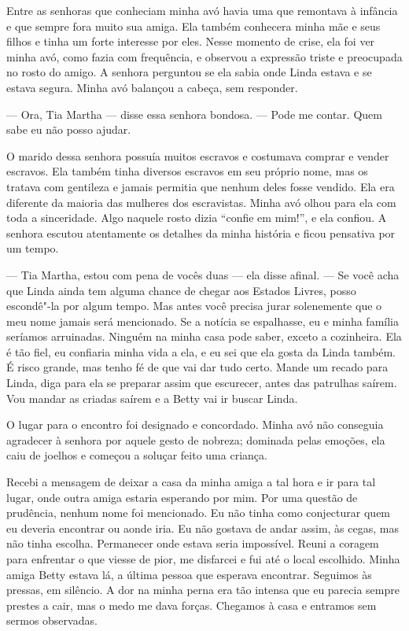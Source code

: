 Entre as senhoras que conheciam minha
avó havia uma que remontava à infância e que sempre fora muito sua
amiga. Ela também conhecera minha mãe e seus filhos e tinha um forte
interesse por eles. Nesse momento de crise, ela foi ver minha avó, como
fazia com frequência, e observou a expressão triste e preocupada no
rosto do amigo. A senhora perguntou se ela sabia onde Linda estava e se
estava segura. Minha avó balançou a cabeça, sem responder.

--- Ora, Tia Martha --- disse essa senhora bondosa. --- Pode me contar.
Quem sabe eu não posso ajudar.

O marido dessa senhora possuía muitos escravos e costumava comprar e
vender escravos. Ela também tinha diversos escravos em seu próprio nome,
mas os tratava com gentileza e jamais permitia que nenhum deles fosse
vendido. Ela era diferente da maioria das mulheres dos escravistas.
Minha avó olhou para ela com toda a sinceridade. Algo naquele rosto
dizia ``confie em mim!'', e ela confiou. A senhora escutou atentamente
os detalhes da minha história e ficou pensativa por um tempo.

--- Tia Martha, estou com pena de vocês duas --- ela disse afinal. ---
Se você acha que Linda ainda tem alguma chance de chegar aos Estados
Livres, posso escondê"-la por algum tempo. Mas antes você precisa jurar
solenemente que o meu nome jamais será mencionado. Se a notícia se
espalhasse, eu e minha família seríamos arruinadas. Ninguém na minha
casa pode saber, exceto a cozinheira. Ela é tão fiel, eu confiaria minha
vida a ela, e eu sei que ela gosta da Linda também. É risco grande, mas
tenho fé de que vai dar tudo certo. Mande um recado para Linda, diga
para ela se preparar assim que escurecer, antes das patrulhas saírem.
Vou mandar as criadas saírem e a Betty vai ir buscar Linda.

O lugar para o encontro foi designado e concordado. Minha avó não
conseguia agradecer à senhora por aquele gesto de nobreza; dominada
pelas emoções, ela caiu de joelhos e começou a soluçar feito uma
criança.

Recebi a mensagem de deixar a casa da
minha amiga a tal hora e ir para tal lugar, onde outra amiga estaria
esperando por mim. Por uma questão de prudência, nenhum nome foi
mencionado. Eu não tinha como conjecturar quem eu deveria encontrar ou
aonde iria. Eu não gostava de andar assim, às cegas, mas não tinha
escolha. Permanecer onde estava seria impossível. Reuni a coragem para
enfrentar o que viesse de pior, me disfarcei e fui até o local
escolhido. Minha amiga Betty estava lá, a última pessoa que esperava
encontrar. Seguimos às pressas, em silêncio. A dor na minha perna era
tão intensa que eu parecia sempre prestes a cair, mas o medo me dava
forças. Chegamos à casa e entramos sem sermos observadas.

